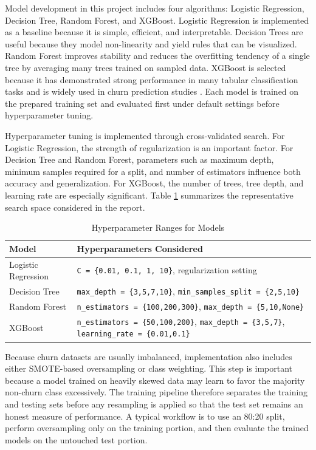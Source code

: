Model development in this project includes four algorithms: Logistic Regression, Decision Tree, Random Forest, and XGBoost. Logistic Regression is implemented as a baseline because it is simple, efficient, and interpretable. Decision Trees are useful because they model non-linearity and yield rules that can be visualized. Random Forest improves stability and reduces the overfitting tendency of a single tree by averaging many trees trained on sampled data. XGBoost is selected because it has demonstrated strong performance in many tabular classification tasks and is widely used in churn prediction studies \cite{imani2024,bhattacharjee2026}. Each model is trained on the prepared training set and evaluated first under default settings before hyperparameter tuning.

Hyperparameter tuning is implemented through cross-validated search. For Logistic Regression, the strength of regularization is an important factor. For Decision Tree and Random Forest, parameters such as maximum depth, minimum samples required for a split, and number of estimators influence both accuracy and generalization. For XGBoost, the number of trees, tree depth, and learning rate are especially significant. Table \ref{tab:hyperparameters_impl} summarizes the representative search space considered in the report.

\begin{table}[H]
\centering
\caption{Hyperparameter Ranges for Models}
\begin{tabular}{|p{3cm}|p{8.5cm}|}
\hline
\textbf{Model} & \textbf{Hyperparameters Considered} \\ \hline
Logistic Regression & \texttt{C = \{0.01, 0.1, 1, 10\}}, regularization setting \\ \hline
Decision Tree & \texttt{max\_depth = \{3,5,7,10\}}, \texttt{min\_samples\_split = \{2,5,10\}} \\ \hline
Random Forest & \texttt{n\_estimators = \{100,200,300\}}, \texttt{max\_depth = \{5,10,None\}} \\ \hline
XGBoost & \texttt{n\_estimators = \{50,100,200\}}, \texttt{max\_depth = \{3,5,7\}}, \texttt{learning\_rate = \{0.01,0.1\}} \\ \hline
\end{tabular}
\label{tab:hyperparameters_impl}
\end{table}

Because churn datasets are usually imbalanced, implementation also includes either SMOTE-based oversampling or class weighting. This step is important because a model trained on heavily skewed data may learn to favor the majority non-churn class excessively. The training pipeline therefore separates the training and testing sets before any resampling is applied so that the test set remains an honest measure of performance. A typical workflow is to use an 80:20 split, perform oversampling only on the training portion, and then evaluate the trained models on the untouched test portion.

